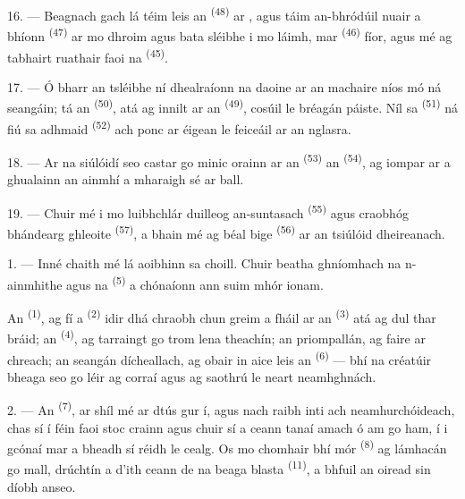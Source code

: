 \VUsaut{3.0mm}

16. --- Beagnach gach lá téim leis an  \textsuperscript{(48)} ar
, agus táim an-bhródúil nuair a bhíonn 
\textsuperscript{(47)} ar mo dhroim agus bata sléibhe i mo láimh, mar
 \textsuperscript{(46)} fíor, agus mé ag tabhairt ruathair faoi
na  \textsuperscript{(45)}.

17. --- Ó bharr an tsléibhe ní dhealraíonn na daoine ar an machaire níos mó ná
seangáin; tá an  \textsuperscript{(50)}, atá ag innilt ar an
 \textsuperscript{(49)}, cosúil le bréagán páiste. Níl sa
 \textsuperscript{(51)} ná fiú sa  adhmaid
\textsuperscript{(52)} ach ponc ar éigean le feiceáil ar an nglasra.

18. --- Ar na siúlóidí seo castar go minic orainn ar an 
\textsuperscript{(53)} an  \textsuperscript{(54)}, ag
iompar ar a ghualainn an ainmhí a mharaigh sé ar ball.

19. --- Chuir mé i mo luibhchlár duilleog an-suntasach 
\textsuperscript{(55)} agus craobhóg bhándearg ghleoite 
\textsuperscript{(57)}, a bhain mé ag béal  bige
\textsuperscript{(56)} ar an tsiúlóid dheireanach.

\VUsaut{3.0mm}
\VUsaut{3.0mm}

\VUsaut{3.0mm}

1. --- Inné chaith mé lá aoibhinn sa choill. Chuir beatha ghníomhach na n-ainmhithe
agus na  \textsuperscript{(5)} a chónaíonn ann suim mhór ionam.

An  \textsuperscript{(1)}, ag fí a 
\textsuperscript{(2)} idir dhá chraobh chun greim a fháil ar an 
\textsuperscript{(3)} atá ag dul thar bráid; an 
\textsuperscript{(4)}, ag tarraingt go trom lena theachín; an priompallán, ag faire
ar chreach; an seangán dícheallach, ag obair in aice leis an
 \textsuperscript{(6)} --- bhí na créatúir bheaga seo go léir
ag corraí agus ag saothrú le neart neamhghnách.

2. --- An  \textsuperscript{(7)}, ar shíl mé ar dtús gur
 í, agus nach raibh inti ach 
neamhurchóideach, chas sí í féin faoi stoc crainn agus chuir sí a ceann tanaí
amach ó am go ham, í i gcónaí mar a bheadh sí réidh le cealg. Os mo chomhair bhí
 mór \textsuperscript{(8)} ag lámhacán go mall, drúchtín a d'ith
ceann de na  beaga blasta \textsuperscript{(11)}, a bhfuil an
oiread sin díobh anseo.

